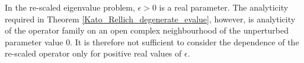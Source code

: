 \documentclass[preprint,12pt]{elsarticle}
\newtheorem{theorem}{Theorem}[section]
\newtheorem{corollary}[theorem]{Corollary}
\begin{document}




In the re-scaled eigenvalue problem, $\epsilon>0$ is a real
parameter. The analyticity required in Theorem
\ref{Kato_Rellich_degenerate_evalue}, however, is analyticity of the
operator family on an open complex neighbourhood of the unperturbed
parameter value $0$. It is therefore not sufficient to consider the
dependence of the re-scaled operator only for positive real values of
$\epsilon$.
\end{document}
